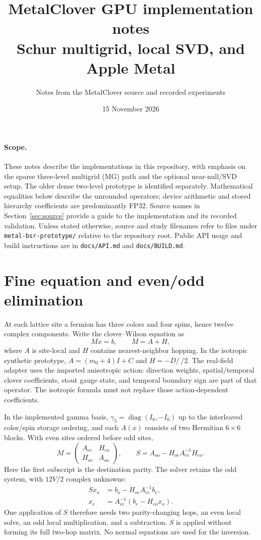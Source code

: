 \documentclass[11pt]{article}
\title{MetalClover GPU implementation notes\\\large Schur multigrid, local SVD, and Apple Metal}
\author{Notes from the MetalClover source and recorded experiments}
\date{15 November 2026}
\newcommand{\file}[1]{\nolinkurl{#1}}
\begin{document}
\maketitle

\paragraph{Scope.}
These notes describe the implementations in this repository, with emphasis on
the sparse three-level multigrid (MG) path and the optional near-null/SVD setup.
The older dense two-level prototype is identified separately. Mathematical
equalities below describe the unrounded operators; device arithmetic and stored
hierarchy coefficients are predominantly FP32. Source names in Section~\ref{sec:source}
provide a guide to the implementation and its recorded validation.
Unless stated otherwise, source and study filenames refer to files under
\file{metal-bsr-prototype/} relative to the repository root. Public API usage
and build instructions are in \file{docs/API.md} and \file{docs/BUILD.md}.

\section{Fine equation and even/odd elimination}
At each lattice site a fermion has three colors and four spins, hence twelve
complex components. Write the clover--Wilson equation as
\begin{equation}
 Mx=b,\qquad M=A+H,
\end{equation}
where $A$ is site-local and $H$ contains nearest-neighbor hopping. In the
isotropic synthetic prototype, $A=(m_0+4)I+C$ and $H=-D\!\!\!\!/\,/2$.
The real-field adapter uses the imported anisotropic action: direction weights,
spatial/temporal clover coefficients, stout gauge state, and temporal boundary
sign are part of that operator. The isotropic formula must not replace those
action-dependent coefficients.

In the implemented gamma basis, $\gamma_5=\operatorname{diag}(I_6,-I_6)$
up to the interleaved color/spin storage ordering, and each $A(x)$ consists
of two Hermitian $6\times6$ blocks. With even sites ordered before odd sites,
\begin{equation}
 M=\begin{pmatrix}A_{ee}&H_{eo}\\H_{oe}&A_{oo}\end{pmatrix},\qquad
 S=A_{oo}-H_{oe}A_{ee}^{-1}H_{eo}.
 \label{eq:schur}
\end{equation}
Here the first subscript is the destination parity. The solver retains the
odd system, with $12V/2$ complex unknowns:
\begin{align}
 Sx_o&=b_o-H_{oe}A_{ee}^{-1}b_e,\\
 x_e&=A_{ee}^{-1}(b_e-H_{eo}x_o).
\end{align}
One application of $S$ therefore needs two parity-changing hops, an even
local solve, an odd local multiplication, and a subtraction. $S$ is applied
without forming its full two-hop matrix. No normal equations are used for
the inversion.
\end{document}

